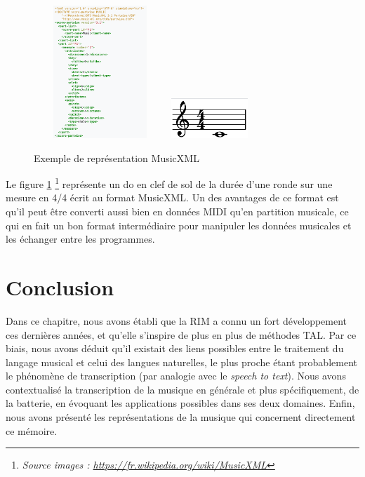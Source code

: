 \begin{figure}[h]
	\centering
	\includegraphics[height=50mm, width=50mm]{
    z_images/1_contexte/6_musicxml_0.png}
    \includegraphics[height=15mm, width=30mm]{
    z_images/1_contexte/6_musicxml_1.png}
	\caption{Exemple de représentation MusicXML} 
	\label{MusicXML}
\end{figure}

Le figure \ref{MusicXML}
\footnote{\textit{Source images :
\url{https://fr.wikipedia.org/wiki/MusicXML}}}
représente un do en clef de sol de la durée d’une ronde sur une mesure en 4/4
écrit au format MusicXML.
Un des avantages de ce format est qu’il peut être converti aussi bien en
données MIDI qu’en partition musicale, ce qui en fait un bon format
intermédiaire pour manipuler les données musicales et les échanger entre les
programmes.

\section*{Conclusion}
Dans ce chapitre, nous avons établi que la RIM a connu un fort développement
ces dernières années, et qu’elle s’inspire de plus en plus de méthodes TAL. Par
ce biais, nous avons déduit qu’il existait des liens possibles entre le
traitement du langage musical et celui des langues naturelles, le plus proche
étant probablement le phénomène de transcription (par analogie avec le
\textit{speech to text}). Nous avons contextualisé la transcription de la
musique en générale et plus spécifiquement, de la batterie, en évoquant les
applications possibles dans ses deux domaines. Enfin, nous avons présenté les
représentations de la musique qui concernent directement ce mémoire.
